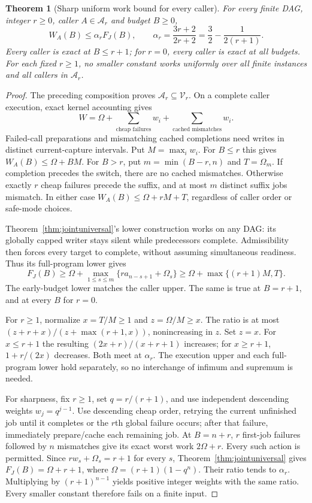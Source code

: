 \documentclass[acmsmall,screen,review,anonymous]{acmart}
\newtheorem{theorem}{Theorem}
\begin{document}
\begin{theorem}[Sharp uniform work bound for every caller]
\label{thm:approx}
For every finite DAG, integer $r\ge0$, caller $A\in\mathcal A_r$ and budget $B\ge0$,
\[
 W_A(B)\le\alpha_r F_J(B),\qquad
 \alpha_r=\frac{3r+2}{2r+2}=\frac32-\frac1{2(r+1)}.
\]
Every caller is exact at $B\le r+1$; for $r=0$, every caller is exact at all budgets. For each fixed $r\ge1$, no smaller constant works uniformly over all finite instances and all callers in $\mathcal A_r$.
\end{theorem}
\begin{proof}
The preceding composition proves $\mathcal A_r\subseteq\mathcal V_r$. On a complete caller execution, exact kernel accounting gives
\[
 W=\Omega+\sum_{\text{cheap failures}}w_i+
                  \sum_{\text{cached mismatches}}w_i.
\]
Failed-call preparations and mismatching cached completions need writes in distinct current-capture intervals. Put $M=\max_iw_i$. For $B\le r$ this gives $W_A(B)\le\Omega+BM$. For $B>r$, put $m=\min(B-r,n)$ and $T=\Omega_m$. If completion precedes the switch, there are no cached mismatches. Otherwise exactly $r$ cheap failures precede the suffix, and at most $m$ distinct suffix jobs mismatch. In either case $W_A(B)\le\Omega+rM+T$, regardless of caller order or safe-mode choices.

Theorem~\ref{thm:jointuniversal}'s lower construction works on any DAG: its globally capped writer stays silent while predecessors complete. Admissibility then forces every target to complete, without assuming simultaneous readiness. Thus its full-program lower gives
\[
 F_J(B)\ge\Omega+
 \max_{1\le s\le m}\{r a_{n-s+1}+\Omega_s\}
 \ge\Omega+\max\{(r+1)M,T\}.
\]
The early-budget lower matches the caller upper. The same is true at $B=r+1$, and at every $B$ for $r=0$.

For $r\ge1$, normalize $x=T/M\ge1$ and $z=\Omega/M\ge x$. The ratio is at most $(z+r+x)/(z+\max(r+1,x))$, nonincreasing in $z$. Set $z=x$. For $x\le r+1$ the resulting $(2x+r)/(x+r+1)$ increases; for $x\ge r+1$, $1+r/(2x)$ decreases. Both meet at $\alpha_r$. The execution upper and each full-program lower hold separately, so no interchange of infimum and supremum is needed.

For sharpness, fix $r\ge1$, set $q=r/(r+1)$, and use independent descending weights $w_j=q^{j-1}$. Use descending cheap order, retrying the current unfinished job until it completes or the $r$th global failure occurs; after that failure, immediately prepare/cache each remaining job. At $B=n+r$, $r$ first-job failures followed by $n$ mismatches give its exact worst work $2\Omega+r$. Every such action is permitted. Since $r w_s+\Omega_s=r+1$ for every $s$, Theorem~\ref{thm:jointuniversal} gives $F_J(B)=\Omega+r+1$, where $\Omega=(r+1)(1-q^n)$. Their ratio tends to $\alpha_r$. Multiplying by $(r+1)^{n-1}$ yields positive integer weights with the same ratio. Every smaller constant therefore fails on a finite input.
\end{proof}
\end{document}
